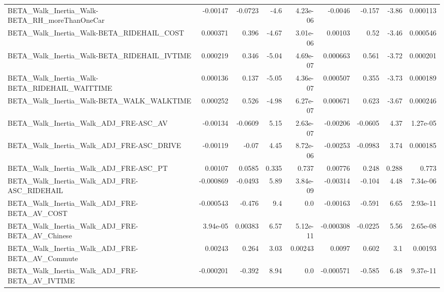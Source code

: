 \begin{tabular}{lrrrrrrrr}
BETA\_Walk\_Inertia\_Walk-BETA\_RH\_moreThanOneCar      &    -0.00147 &      -0.0723 &     -4.6 & 4.23e-06 &    -0.0046 &      -0.157 &        -3.86 &      0.000113 \\
BETA\_Walk\_Inertia\_Walk-BETA\_RIDEHAIL\_COST          &    0.000371 &        0.396 &    -4.67 & 3.01e-06 &    0.00103 &        0.52 &        -3.46 &      0.000546 \\
BETA\_Walk\_Inertia\_Walk-BETA\_RIDEHAIL\_IVTIME        &    0.000219 &        0.346 &    -5.04 & 4.69e-07 &   0.000663 &       0.561 &        -3.72 &      0.000201 \\
BETA\_Walk\_Inertia\_Walk-BETA\_RIDEHAIL\_WAITTIME      &    0.000136 &        0.137 &    -5.05 & 4.36e-07 &   0.000507 &       0.355 &        -3.73 &      0.000189 \\
BETA\_Walk\_Inertia\_Walk-BETA\_WALK\_WALKTIME          &    0.000252 &        0.526 &    -4.98 & 6.27e-07 &   0.000671 &       0.623 &        -3.67 &      0.000246 \\
BETA\_Walk\_Inertia\_Walk\_ADJ\_FRE-ASC\_AV              &    -0.00134 &      -0.0609 &     5.15 & 2.63e-07 &   -0.00206 &     -0.0605 &         4.37 &      1.27e-05 \\
BETA\_Walk\_Inertia\_Walk\_ADJ\_FRE-ASC\_DRIVE           &    -0.00119 &        -0.07 &     4.45 & 8.72e-06 &   -0.00253 &     -0.0983 &         3.74 &      0.000185 \\
BETA\_Walk\_Inertia\_Walk\_ADJ\_FRE-ASC\_PT              &     0.00107 &       0.0585 &    0.335 &    0.737 &    0.00776 &       0.248 &        0.288 &         0.773 \\
BETA\_Walk\_Inertia\_Walk\_ADJ\_FRE-ASC\_RIDEHAIL        &   -0.000869 &      -0.0493 &     5.89 & 3.84e-09 &   -0.00314 &      -0.104 &         4.48 &      7.34e-06 \\
BETA\_Walk\_Inertia\_Walk\_ADJ\_FRE-BETA\_AV\_COST        &   -0.000543 &       -0.476 &      9.4 &      0.0 &   -0.00163 &      -0.591 &         6.65 &      2.93e-11 \\
BETA\_Walk\_Inertia\_Walk\_ADJ\_FRE-BETA\_AV\_Chinese     &    3.94e-05 &      0.00383 &     6.57 & 5.12e-11 &  -0.000308 &     -0.0225 &         5.56 &      2.65e-08 \\
BETA\_Walk\_Inertia\_Walk\_ADJ\_FRE-BETA\_AV\_Commute     &     0.00243 &        0.264 &     3.03 &  0.00243 &     0.0097 &       0.602 &          3.1 &       0.00193 \\
BETA\_Walk\_Inertia\_Walk\_ADJ\_FRE-BETA\_AV\_IVTIME      &   -0.000201 &       -0.392 &     8.94 &      0.0 &  -0.000571 &      -0.585 &         6.48 &      9.37e-11 \\

\end{tabular}
